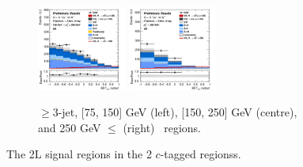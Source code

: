 \begin{figure}[h!]
\begin{subfigure}[b]{\textwidth}
        \includegraphics[width=0.32\textwidth]{Images/VH/Own_fit/prefit_VHcc/Region_distmva_BMax250_BMin150_DSR_J3_TTypext_incJet1_T2_L2_Y6051_Prefit.png}
        \includegraphics[width=0.32\textwidth]{Images/VH/Own_fit/prefit_VHcc/Region_distmva_BMin250_DSR_J3_TTypext_incJet1_T2_L2_Y6051_Prefit.png}
        \caption{$\geq$3-jet, [75, 150] GeV (left), [150, 250] GeV (centre), and 250  GeV $\leq$ (right) \ptv\ regions.}
        \label{fig:plots_VHcc_2L_SR_2c_3J}
    \end{subfigure}
    \caption{The 2L signal regions in the 2 $c$-tagged regionss.}
    \label{fig:plots_VHcc_2L_SR_2c}
\end{figure}
